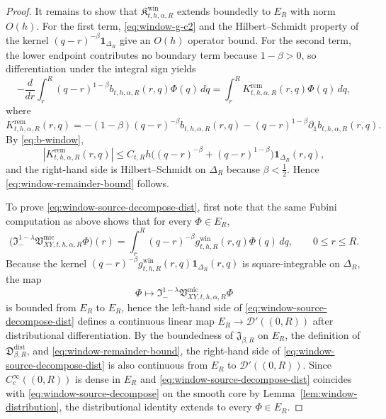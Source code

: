 \documentclass[11pt,a4paper]{amsart}
\theoremstyle{plain}
\theoremstyle{definition}
\theoremstyle{remark}
\newcommand{\one}{\mathbf 1}
\begin{document}
\begin{proof}
It remains to show that \(\mathfrak K_{t,h,\alpha,R}^{\mathrm{win}}\) extends boundedly to \(E_R\)
with norm \(O(h)\). For the first term, \eqref{eq:window-g-c2} and the Hilbert--Schmidt property
of the kernel \((q-r)^{-\beta}\one_{\Delta_R}\) give an \(O(h)\) operator bound. For the second
term, the lower endpoint contributes no boundary term because \(1-\beta>0\), so differentiation
under the integral sign yields
\[
-\frac{d}{dr}
\int_r^R (q-r)^{1-\beta}
b_{t,h,\alpha,R}(r,q)\Phi(q)\,dq
=
\int_r^R
K_{t,h,\alpha,R}^{\mathrm{rem}}(r,q)\Phi(q)\,dq,
\]
where
\[
K_{t,h,\alpha,R}^{\mathrm{rem}}(r,q)
=
-(1-\beta)(q-r)^{-\beta}b_{t,h,\alpha,R}(r,q)
-
(q-r)^{1-\beta}\partial_1 b_{t,h,\alpha,R}(r,q).
\]
By \eqref{eq:b-window},
\[
|K_{t,h,\alpha,R}^{\mathrm{rem}}(r,q)|
\le
C_{t,R}h
\bigl(
(q-r)^{-\beta}+(q-r)^{1-\beta}
\bigr)\one_{\Delta_R}(r,q),
\]
and the right-hand side is Hilbert--Schmidt on \(\Delta_R\) because \(\beta<\tfrac12\). Hence
\eqref{eq:window-remainder-bound} follows.

To prove \eqref{eq:window-source-decompose-dist}, first note that the same Fubini computation as
above shows that for every \(\Phi\in E_R\),
\[
\bigl(
\mathfrak I_-^{1-\lambda}
\mathfrak V_{XY,t,h,\alpha,R}^{\mathrm{mic}}\Phi
\bigr)(r)
=
\int_r^R
(q-r)^{-\beta}
g_{t,h,R}^{\mathrm{win}}(r,q)\Phi(q)\,dq,
\qquad 0\le r\le R.
\]
Because the kernel \((q-r)^{-\beta}g_{t,h,R}^{\mathrm{win}}(r,q)\one_{\Delta_R}(r,q)\) is
square-integrable on \(\Delta_R\), the map
\[
\Phi\longmapsto
\mathfrak I_-^{1-\lambda}
\mathfrak V_{XY,t,h,\alpha,R}^{\mathrm{mic}}\Phi
\]
is bounded from \(E_R\) to \(E_R\), hence the left-hand side of
\eqref{eq:window-source-decompose-dist} defines a continuous linear map \(E_R\to\mathcal D'((0,R))\)
after distributional differentiation. By the boundedness of \(\mathfrak J_{\beta,R}\) on \(E_R\),
the definition of \(\mathfrak D_{\beta,R}^{\mathrm{dist}}\), and
\eqref{eq:window-remainder-bound}, the right-hand side of
\eqref{eq:window-source-decompose-dist} is also continuous from \(E_R\) to \(\mathcal D'((0,R))\).
Since \(C_c^\infty((0,R))\) is dense in \(E_R\) and \eqref{eq:window-source-decompose-dist}
coincides with \eqref{eq:window-source-decompose} on the smooth core by
Lemma~\ref{lem:window-distribution}, the distributional identity extends to every \(\Phi\in E_R\).
\end{proof}
\end{document}
